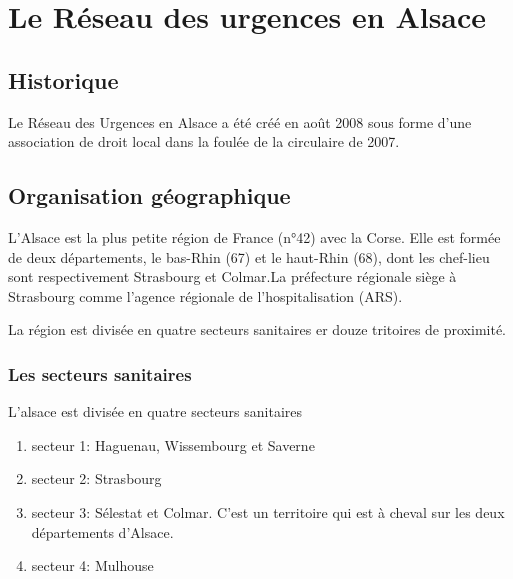 \documentclass[12pt,english,french,twoside]{report}\usepackage[]{graphicx}\usepackage[]{color}
\begin{document}
\part{Le Réseau des urgences en Alsace}
\newpage

\chapter{Historique}
%


Le Réseau des Urgences en Alsace a été créé en août 2008 sous forme d'une association de droit local dans la foulée de la circulaire de 2007.



\newpage
\chapter{Organisation géographique}
% 


L'Alsace est la plus petite région de France (n°42) avec la Corse. Elle est formée de deux départements, le bas-Rhin (67) et le haut-Rhin (68), dont les chef-lieu sont respectivement Strasbourg et Colmar.La préfecture régionale siège à Strasbourg comme l'agence régionale de l'hospitalisation  (ARS).

La région est divisée en quatre secteurs sanitaires er douze tritoires de proximité.

\section{Les secteurs sanitaires}

L'alsace est divisée en quatre secteurs sanitaires
\begin{enumerate}
  \item secteur 1: Haguenau, Wissembourg et Saverne
  \item secteur 2: Strasbourg
  \item secteur 3: Sélestat et Colmar. C'est un territoire qui est à cheval sur les deux départements d'Alsace.
  \item secteur 4: Mulhouse
\end{enumerate}
\end{document}
